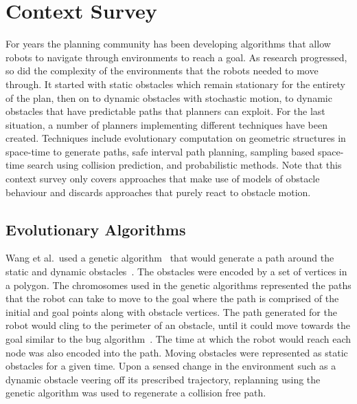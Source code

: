 


\chapter{Context Survey}

\label{chapter:contextsurvey}

For years the planning community has been developing algorithms that allow
robots to navigate through environments to reach a goal. As research
progressed, so did the complexity of the environments that the robots needed to
move through. It started with static obstacles which remain stationary for the
entirety of the plan, then on to dynamic obstacles with stochastic motion, to
dynamic obstacles that have predictable paths that planners can exploit. For
the last situation, a number of planners implementing different techniques have
been created. Techniques include evolutionary computation on geometric
structures in space-time to generate paths, safe interval path planning,
sampling based space-time search using collision prediction, and probabilistic
methods. Note that this context survey only covers approaches that make use of
models of obstacle behaviour and discards approaches that purely react to
obstacle motion.

\section{Evolutionary Algorithms}

Wang et al.\ used a genetic algorithm~\cite{galletly1992overview} that would
generate a path around the static and dynamic obstacles~\cite{wang2007mobile}.
The obstacles were encoded by a set of vertices in a polygon. The chromosomes
used in the genetic algorithms represented the paths that the robot can take to
move to the goal where the path is comprised of the initial and goal points
along with obstacle vertices.  The path generated for the robot would cling to
the perimeter of an obstacle, until it could move towards the goal similar to
the bug algorithm~\cite{weir}. The time at which the robot would reach each
node was also encoded into the path. Moving obstacles were represented as
static obstacles for a given time. Upon a sensed change in the environment such
as a dynamic obstacle veering off its prescribed trajectory, replanning using
the genetic algorithm was used to regenerate a collision free path.

